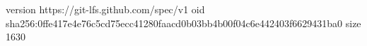version https://git-lfs.github.com/spec/v1
oid sha256:0ffe417e4e76c5cd75ecc41280faacd0b03bb4b00f04c6e442403f6629431ba0
size 1630
